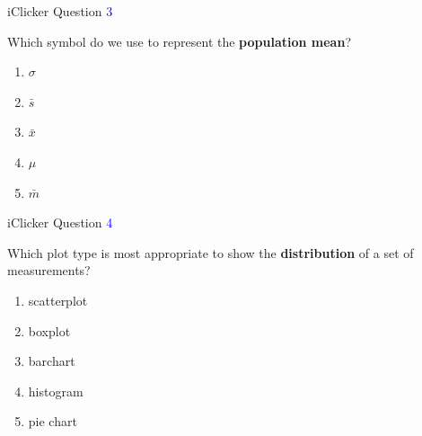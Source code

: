 \documentclass[ignorenonframetext,t]{beamer}
\begin{document}
\begin{frame}{iClicker Question \textcolor{blue}{3}}

Which symbol do we use to represent the \textbf{population mean}?

\begin{enumerate}[A]
\item $\sigma$
\item $\bar s$
\item $\bar{x}$
\item $\mu$
\item $\bar{m}$
\end{enumerate}

\vfill


\end{frame}

\begin{frame}{iClicker Question \textcolor{blue}{4}}

Which plot type is most appropriate to show the \textbf{distribution} of
a set of measurements?

\begin{enumerate}[A]
\item scatterplot
\item boxplot
\item barchart
\item histogram
\item pie chart
\end{enumerate}

\vfill


\end{frame}
\end{document}
